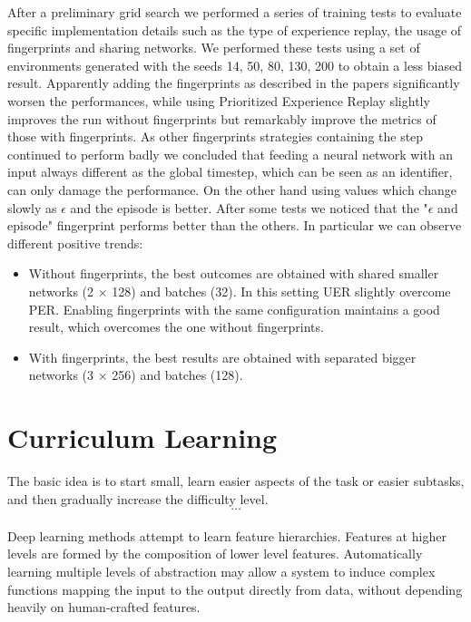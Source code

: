 \documentclass[11pt, a4paper, hidelinks]{report}
\begin{document}
After a preliminary grid search we performed a series of training tests to evaluate specific implementation details such as the type of experience replay, the usage of fingerprints and sharing networks.
We performed these tests using a set of environments generated with the seeds 14, 50, 80, 130, 200 to obtain a less biased result.
Apparently adding the fingerprints as described in the papers significantly worsen the performances, while using Prioritized Experience Replay slightly improves the run without fingerprints but remarkably improve the metrics of those with fingerprints.
As other fingerprints strategies containing the step continued to perform badly we concluded that feeding a neural network with an input always different as the global timestep, which can be seen as an identifier, can only damage the performance.
On the other hand using values which change slowly as $\epsilon$ and the episode is better.
After some tests we noticed that the "$\epsilon$ and episode" fingerprint performs better than the others.
In particular we can observe different positive trends:
\begin{itemize}
	\item Without fingerprints, the best outcomes are obtained with shared smaller networks (2 $\times$ 128) and batches (32).
In this setting UER slightly overcome PER\@.
Enabling fingerprints with the same configuration maintains a good result, which overcomes the one without fingerprints.
	\item With fingerprints, the best results are obtained with separated bigger networks (3 $\times$ 256) and batches (128).
\end{itemize}

\section{Curriculum Learning}\label{sec:curriculum-learning}

\begin{quoting}[font=itshape, begintext={"}, endtext={"\citep{bengio-curiculum}}]
The basic idea is to start small, learn easier aspects of the task or easier subtasks, and then gradually increase the difficulty level.\\
\[\dots\]\\
Deep learning methods attempt to learn feature hierarchies.
Features at higher levels are formed by the composition of lower level features.
Automatically learning multiple levels of abstraction may allow a system to induce complex functions mapping the input to the output directly from data, without depending heavily on human-crafted features.
\end{quoting}
\end{document}
